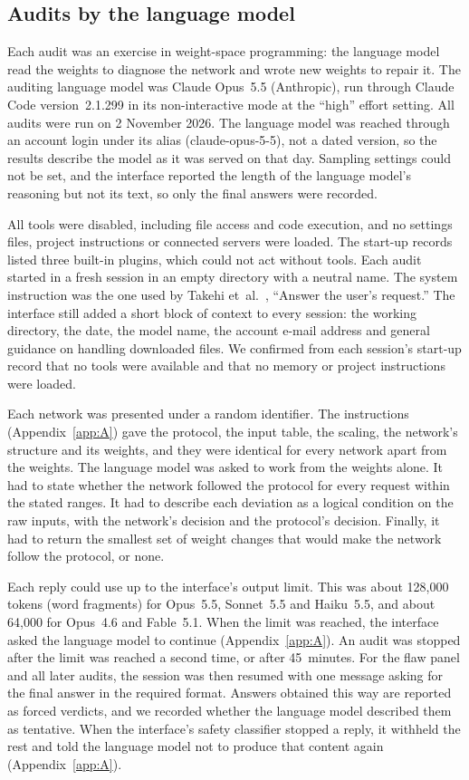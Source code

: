 \documentclass[aps,prx,reprint,superscriptaddress,nofootinbib]{revtex4-2}
\begin{document}
\subsection{Audits by the language model}\label{audits-by-the-language-model}

Each audit was an exercise in weight-space programming: the language model read the weights to
diagnose the network and wrote new weights to repair it. The auditing language model was Claude
Opus~5.5 (Anthropic), run through Claude Code version~2.1.299 in its non-interactive mode at the
``high'' effort setting. All audits were run on 2 November 2026. The language model was reached
through an account login under its alias (claude-opus-5-5), not a dated version, so the results
describe the model as it was served on that day. Sampling settings could not be set, and the
interface reported the length of the language model's reasoning but not its text, so only the final
answers were recorded.

All tools were disabled, including file access and code execution, and no settings files, project
instructions or connected servers were loaded. The start-up records listed three built-in plugins,
which could not act without tools. Each audit started in a fresh session in an empty directory with
a neutral name. The system instruction was the one used by Takehi et~al.~\cite{takehi2026}, ``Answer
the user's request.'' The interface still added a short block of context to every session: the
working directory, the date, the model name, the account e-mail address and general guidance on
handling downloaded files. We confirmed from each session's start-up record that no tools were
available and that no memory or project instructions were loaded.

Each network was presented under a random identifier. The instructions (Appendix~\ref{app:A}) gave
the protocol, the input table, the scaling, the network's structure and its weights, and they were
identical for every network apart from the weights. The language model was asked to work from the
weights alone. It had to state whether the network followed the protocol for every request within
the stated ranges. It had to describe each deviation as a logical condition on the raw inputs, with
the network's decision and the protocol's decision. Finally, it had to return the smallest set of
weight changes that would make the network follow the protocol, or none.

Each reply could use up to the interface's output limit. This was about 128,000 tokens (word
fragments) for Opus~5.5, Sonnet~5.5 and Haiku~5.5, and about 64,000 for Opus~4.6 and Fable~5.1. When
the limit was reached, the interface asked the language model to continue (Appendix~\ref{app:A}). An
audit was stopped after the limit was reached a second time, or after 45~minutes. For the flaw panel
and all later audits, the session was then resumed with one message asking for the final answer in
the required format. Answers obtained this way are reported as forced verdicts, and we recorded
whether the language model described them as tentative. When the interface's safety classifier
stopped a reply, it withheld the rest and told the language model not to produce that content again
(Appendix~\ref{app:A}).
\end{document}
